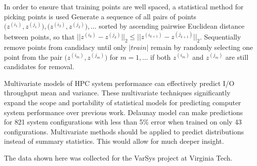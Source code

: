 In order to ensure that training points are well spaced, a statistical method for picking points is used
\bigskip
{} Generate a sequence of all pairs of points $\bigl(z^{(i_1)},z^{(j_1)}\bigr), \bigl(z^{(i_2)},z^{(j_2)}\bigr), \ldots$ sorted by ascending pairwise Euclidean distance between points, so that $\bigl|\bigl|z^{(i_k)}-z^{(j_k)}\bigr|\bigr|_2 \leq \bigl|\bigl|z^{(i_{k+1})}-z^{(j_{k+1})}\bigr|\bigr|_2$.
\bigskip
{} Sequentially remove points from candidacy until only $|train|$ remain by randomly selecting one point from the pair $\bigl(z^{(i_m)}, z^{(j_m)}\bigr)$ for $m = 1,\ldots$ if both $z^{(i_m)}$ and $z^{(j_m)}$ are still candidates for removal.

\vfil\eject

\bigskip\bigskip\bigskip
{}
\vfil\eject

\bigskip\bigskip\bigskip
{}
\vfil\eject


\bigskip\bigskip\bigskip
{}
\vfil\eject

\bigskip\bigskip\bigskip
{}
\vfil\eject

\bigskip\bigskip\bigskip
Multivariate models of HPC system performance can effectively predict
I/O throughput mean and variance. These multivariate techniques
significantly expand the scope and portability of statistical models
for predicting computer system performance over previous work.
\bigskip\bigskip\bigskip
Delaunay model can make predictions for 821 system configurations with less than 5\% error when trained on only 43 configurations.
\bigskip\bigskip\bigskip
Multivariate methods should be applied to predict distributions instead of summary statistics. This would allow for much deeper insight.
\vfil\eject

\bigskip \bigskip
The data shown here was collected for the VarSys project at Virginia Tech.
\vfil\eject

\bye
